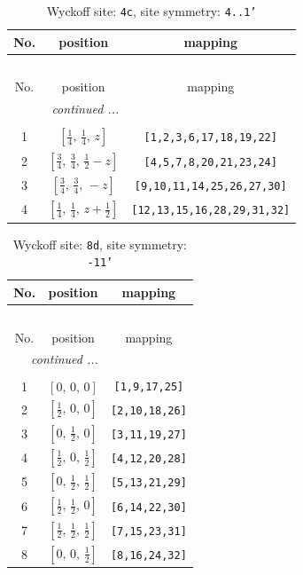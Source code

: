 \documentclass[fleqn,8pt]{jsarticle}
\begin{document}
\renewcommand{\arraystretch}{1.2}
\begin{longtable}{ccc}
\caption{Wyckoff site: {\tt 4c}, site symmetry: {\tt 4..1'}}
 \\
 \hline \hline
No. & position & mapping \\ \hline \endfirsthead

\multicolumn{2}{l}{\tablename\ \thetable{}} \\
 \hline \hline
No. & position & mapping \\ \hline \endhead

 \hline \hline
\multicolumn{2}{r}{\footnotesize\it continued ...} \\ \endfoot

 \hline \hline
\multicolumn{2}{r}{} \\ \endlastfoot

1 & $\left[ \frac{1}{4},\, \frac{1}{4},\, z \right]$ & {\tt [1,2,3,6,17,18,19,22]} \\ \hline
2 & $\left[ \frac{3}{4},\, \frac{3}{4},\, \frac{1}{2} - z \right]$ & {\tt [4,5,7,8,20,21,23,24]} \\ \hline
3 & $\left[ \frac{3}{4},\, \frac{3}{4},\, - z \right]$ & {\tt [9,10,11,14,25,26,27,30]} \\ \hline
4 & $\left[ \frac{1}{4},\, \frac{1}{4},\, z + \frac{1}{2} \right]$ & {\tt [12,13,15,16,28,29,31,32]} \\
\end{longtable}
\renewcommand{\arraystretch}{1.2}
\begin{longtable}{ccc}
\caption{Wyckoff site: {\tt 8d}, site symmetry: {\tt -11'}}
 \\
 \hline \hline
No. & position & mapping \\ \hline \endfirsthead

\multicolumn{2}{l}{\tablename\ \thetable{}} \\
 \hline \hline
No. & position & mapping \\ \hline \endhead

 \hline \hline
\multicolumn{2}{r}{\footnotesize\it continued ...} \\ \endfoot

 \hline \hline
\multicolumn{2}{r}{} \\ \endlastfoot

1 & $\left[ 0,\, 0,\, 0 \right]$ & {\tt [1,9,17,25]} \\ \hline
2 & $\left[ \frac{1}{2},\, 0,\, 0 \right]$ & {\tt [2,10,18,26]} \\ \hline
3 & $\left[ 0,\, \frac{1}{2},\, 0 \right]$ & {\tt [3,11,19,27]} \\ \hline
4 & $\left[ \frac{1}{2},\, 0,\, \frac{1}{2} \right]$ & {\tt [4,12,20,28]} \\ \hline
5 & $\left[ 0,\, \frac{1}{2},\, \frac{1}{2} \right]$ & {\tt [5,13,21,29]} \\ \hline
6 & $\left[ \frac{1}{2},\, \frac{1}{2},\, 0 \right]$ & {\tt [6,14,22,30]} \\ \hline
7 & $\left[ \frac{1}{2},\, \frac{1}{2},\, \frac{1}{2} \right]$ & {\tt [7,15,23,31]} \\ \hline
8 & $\left[ 0,\, 0,\, \frac{1}{2} \right]$ & {\tt [8,16,24,32]} \\
\end{longtable}
\end{document}
